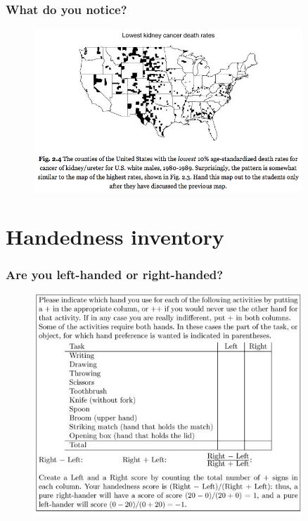\documentclass[compress,handout,10pt]{beamer}
\begin{document}
\begin{frame}
    \frametitle{What do you notice?}
    \vspace{7pt}
    \begin{figure}
        \begin{center}
            \includegraphics[width=0.9\textwidth]{images/LowestKidneyCancerDeathRate.png}
        \end{center}
    \end{figure}
\end{frame}

\section{Handedness inventory}
\begin{frame}
    \frametitle{Are you left-handed or right-handed?}
    \vspace{7pt}
    \begin{figure}
        \begin{center}
            \includegraphics[width=0.9\textwidth]{images/HandednessInventory.png}
        \end{center}
    \end{figure}
\end{frame}
\end{document}
